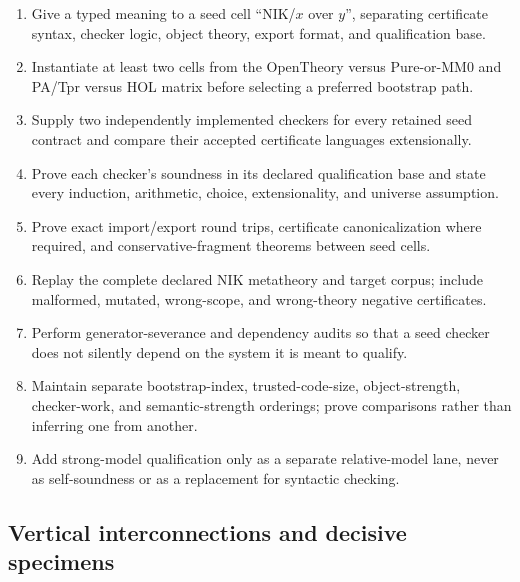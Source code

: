 \documentclass[11pt]{article}
\theoremstyle{definition}
\theoremstyle{remark}
\begin{document}
\begin{enumerate}
\item Give a typed meaning to a seed cell ``NIK/$x$ over $y$'', separating
  certificate syntax, checker logic, object theory, export format, and
  qualification base.
\item Instantiate at least two cells from the OpenTheory versus Pure-or-MM0 and
  PA/Tpr versus HOL matrix before selecting a preferred bootstrap path.
\item Supply two independently implemented checkers for every retained seed
  contract and compare their accepted certificate languages extensionally.
\item Prove each checker's soundness in its declared qualification base and
  state every induction, arithmetic, choice, extensionality, and universe
  assumption.
\item Prove exact import/export round trips, certificate canonicalization where
  required, and conservative-fragment theorems between seed cells.
\item Replay the complete declared NIK metatheory and target corpus; include
  malformed, mutated, wrong-scope, and wrong-theory negative certificates.
\item Perform generator-severance and dependency audits so that a seed checker
  does not silently depend on the system it is meant to qualify.
\item Maintain separate bootstrap-index, trusted-code-size, object-strength,
  checker-work, and semantic-strength orderings; prove comparisons rather than
  inferring one from another.
\item Add strong-model qualification only as a separate relative-model lane,
  never as self-soundness or as a replacement for syntactic checking.
\end{enumerate}

\subsection{Vertical interconnections and decisive specimens}
\end{document}
